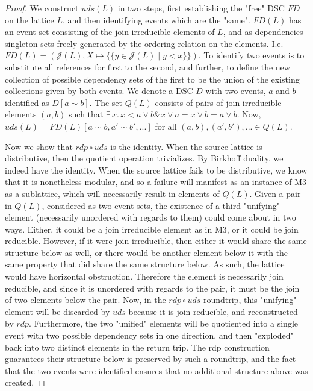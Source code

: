 \documentclass[hoptionsi,review,format=acmsmall]{acmart}
\theoremstyle{definition}
\newcommand{\Jc}{\mathcal{J}}
\newcommand{\band}{\mathbin{\&}}
\begin{document}
\begin{proof}
We construct \(uds(L)\) in two steps, first establishing the "free" DSC \(FD\) on the lattice \(L\), and then identifying events which are the "same". \(FD(L)\) has an event set consisting of the join-irreducible elements of \(L\), and as dependencies singleton sets freely generated by the ordering relation on the elements.  I.e. \(FD(L) = (\Jc(L), X \mapsto \{\{ y \in \Jc(L) \mid y<x\}\})\). To identify two events is to substitute all references for first to the second, and further, to define the new collection of possible dependency sets of the first to be the union of the existing collections given by both events. We denote a DSC \(D\) with two events, \(a\) and \(b\) identified as  \(D[a\sim b]\). The set \(Q(L)\) consists of pairs of join-irreducible elements \((a,b)\) such that  \(\exists\, x . \,  x < a \vee b \band x \vee a = x \vee b = a \vee b\).  Now, \(uds(L) = FD(L)[a \sim b,a' \sim b',...]\) for all \((a,b), (a',b'), ...\in Q(L)\).

Now we show that \(rdp \circ uds\) is the identity. When the source lattice is distributive, then the quotient operation trivializes. By Birkhoff duality, we indeed have the identity. When the source lattice fails to be distributive, we know that it is nonetheless modular, and so a failure will manifest as an instance of M3 as a sublattice, which will necessarily result in elements of \(Q(L)\). Given a pair in \(Q(L)\), considered as two event sets, the existence of a third "unifying" element (necessarily unordered with regards to them) could come about in two ways. Either, it could be a join irreducible element  as in M3, or it could be join reducible. However, if it were join irreducible, then either it would share the same structure below as well, or there would be another element below it with the same property that did share the same structure below. As such, the lattice would have horizontal obstruction. Therefore the element is necessarily join reducible, and since it is unordered with regards to the pair, it must be the join of two elements below the pair. Now, in the \(rdp \circ uds\) roundtrip, this "unifying" element will be discarded by \(uds\) because it is join reducible, and reconstructed by \(rdp\). Furthermore, the two "unified" elements will be quotiented into a single event with two possible dependency sets in one direction, and then "exploded" back into two distinct elements in the return trip. The rdp construction guarantees their structure below is preserved by such a roundtrip, and the fact that the two events were identified ensures that no additional structure above was created.


\end{proof}
\end{document}
